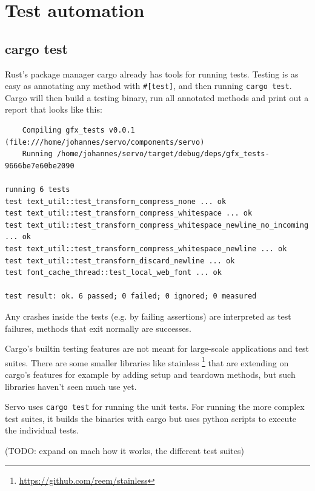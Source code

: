 \documentclass{scrartcl}
\newcommand{\todo}[1] {{\color{red}(TODO: #1)}}
\begin{document}
\newpage



\section{Test automation}


\subsection{cargo test}

Rust's package manager cargo already has tools for running tests. Testing is as easy as annotating any method with \texttt{\#[test]}, and then running \texttt{cargo test}. Cargo will then build a testing binary, run all annotated methods and print out a report that looks like this:


\begin{verbatim}
    Compiling gfx_tests v0.0.1 (file:///home/johannes/servo/components/servo)
    Running /home/johannes/servo/target/debug/deps/gfx_tests-9666be7e60be2090

running 6 tests
test text_util::test_transform_compress_none ... ok
test text_util::test_transform_compress_whitespace ... ok
test text_util::test_transform_compress_whitespace_newline_no_incoming ... ok
test text_util::test_transform_compress_whitespace_newline ... ok
test text_util::test_transform_discard_newline ... ok
test font_cache_thread::test_local_web_font ... ok

test result: ok. 6 passed; 0 failed; 0 ignored; 0 measured

\end{verbatim}

Any crashes inside the tests (e.g. by failing assertions) are interpreted as test failures, methods that exit normally are successes.

Cargo's builtin testing features are not meant for large-scale applications and test suites. There are some smaller libraries like stainless \footnote{\url{https://github.com/reem/stainless}} that are extending on cargo's features for example by adding setup and teardown methods, but such libraries haven't seen much use yet. 

Servo uses \texttt{cargo test} for running the unit tests. For running the more complex test suites, it builds the binaries with cargo but uses python scripts to execute the individual tests.

\todo{expand on mach how it works, the different test suites}
\end{document}
